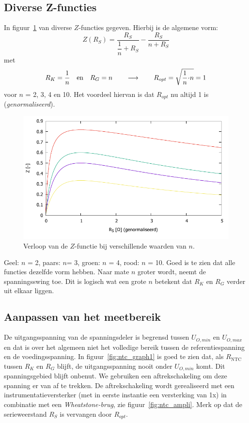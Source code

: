 \documentclass[12pt,a4paper,final,twoside,fleqn]{article}
\newcommand{\rntc}{R_\text{NTC}}
\newcommand{\ropt}{R_{opt}}
\let\oldcdot\cdot
\renewcommand{\cdot}{\kern-.10em\oldcdot\kern-.10em}
\begin{document}
\subsection{Diverse Z-functies}
In figuur~\ref{fig:spanningsswings} van diverse $Z$-functies gegeven. Hierbij is
de algemene vorm:
\begin{equation}
Z(R_S) = \dfrac{R_S}{\dfrac{1}{n}+R_S} - \dfrac{R_S}{n+R_S}
\end{equation}
met
\begin{equation}
R_K = \dfrac{1}{n}\quad\text{en}\quad R_G = n \qquad\longrightarrow\qquad
\ropt = \sqrt{\dfrac{1}{n}\cdot n} = 1
\end{equation}
voor $n$ = 2, 3, 4 en 10. Het voordeel hiervan is dat $\ropt$ nu altijd 1 is
(\textsl{genormaliseerd}).

\begin{figure}[ht!]
\centering
\includegraphics[scale=1]{gnuplot/spanningsswings}
\caption{Verloop van de $Z$-functie bij verschillende waarden van $n$.}
\label{fig:spanningsswings}
\end{figure}
 
Geel: $n$ = 2, paars: $n $= 3, groen: $n$ = 4, rood: $n$ = 10. Goed is te zien
dat alle functies dezelfde vorm hebben. Naar mate $n$ groter wordt, neemt de
spanningsswing toe. Dit is logisch wat een grote $n$ betekent dat $R_K$ en $R_G$
verder uit elkaar liggen.

\subsection{Aanpassen van het meetbereik}
De uitgangsspanning van de spanningsdeler is begrensd tussen $U_{O,min}$ en $U_{O,max}$
en dat is over het algemeen niet het volledige bereik tussen de referentiespanning en
de voedingsspanning.
In figuur~\ref{fig:ntc_graph1} is goed te zien dat, als $\rntc$ tussen $R_K$ en $R_G$
blijft, de uitgangsspanning nooit onder $U_{O,min}$ komt. Dit spanningsgebied blijft
onbenut. We gebruiken een aftrekschakeling om deze spanning er van af te trekken. De
aftrekschakeling wordt gerealiseerd met een instrumentatieversterker (met in eerste
instantie een versterking van 1x) in combinatie met een \textsl{Wheatstone-brug}, zie
figuur~\ref{fig:ntc_ampli}. Merk op dat de serieweerstand $R_S$ is vervangen door
$\ropt$.
\end{document}
